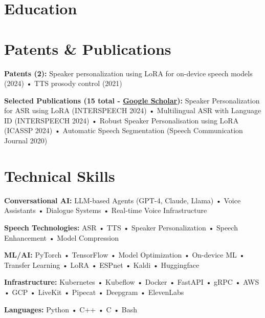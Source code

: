 \documentclass[10pt,a4paper,sans]{moderncv}        %
\begin{document}


  \section{Education}



  \section{Patents \& Publications}

  \textbf{Patents (2):} Speaker personalization using LoRA for on-device speech models (2024) • TTS prosody control (2021)

  \textbf{Selected Publications (15 total - \href{https://scholar.google.co.in/citations?user=6fSYWhkAAAAJ&hl=en}{Google Scholar}):} Speaker Personalization for ASR using LoRA (INTERSPEECH 2024) • Multilingual ASR with Language ID (INTERSPEECH 2024) • Robust Speaker Personalisation using LoRA (ICASSP 2024) • Automatic Speech Segmentation (Speech Communication Journal 2020)


  \section{Technical Skills}

  \textbf{Conversational AI:} LLM-based Agents (GPT-4, Claude, Llama) • Voice Assistants • Dialogue Systems • Real-time Voice Infrastructure

  \textbf{Speech Technologies:} ASR • TTS • Speaker Personalization • Speech Enhancement • Model Compression

  \textbf{ML/AI:} PyTorch • TensorFlow • Model Optimization • On-device ML • Transfer Learning • LoRA • ESPnet • Kaldi • Huggingface

  \textbf{Infrastructure:} Kubernetes • Kubeflow • Docker • FastAPI • gRPC • AWS • GCP • LiveKit • Pipecat • Deepgram • ElevenLabs

  \textbf{Languages:} Python • C++ • C • Bash


  
\end{document}
